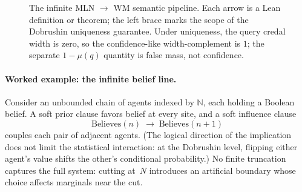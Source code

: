 \documentclass[11pt,openany]{report}
\begin{document}
\begin{figure}[htbp]
\centering
{}
\caption{The infinite MLN $\to$ WM semantic pipeline.  Each arrow is a
  Lean definition or theorem; the left brace marks the scope of the
  Dobrushin uniqueness guarantee. Under uniqueness, the query credal width is
  zero, so the confidence-like width-complement is $1$; the separate
  $1-\mu(q)$ quantity is false mass, not confidence.}
\label{fig:infinite-mln-pipeline}
\end{figure}

\paragraph{Worked example: the infinite belief line.}
Consider an unbounded chain of agents indexed by $\mathbb{N}$, each holding a
Boolean belief.  A soft prior clause favors belief at every site, and a soft
influence clause
\[
  \mathrm{Believes}(n) \;\to\; \mathrm{Believes}(n{+}1)
\]
couples each pair of adjacent agents.  (The logical direction of the implication
does not limit the statistical interaction: at the Dobrushin level, flipping
either agent's value shifts the other's conditional probability.)  No finite
truncation captures the full system: cutting at~$N$ introduces an artificial
boundary whose choice affects marginals near the cut.
\end{document}
